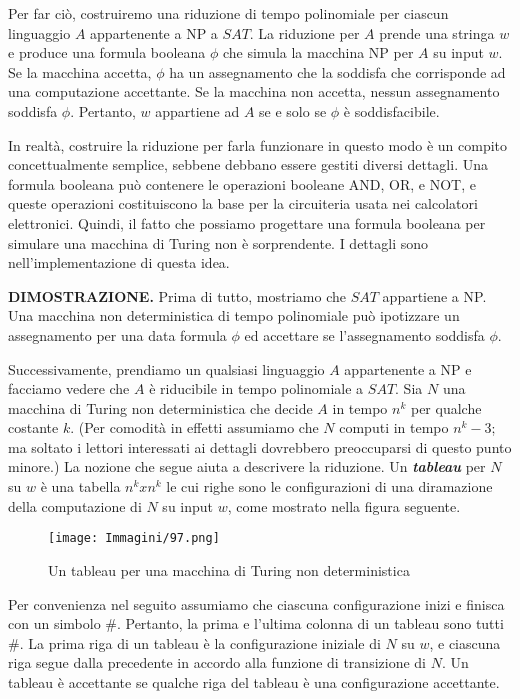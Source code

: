 \documentclass{article}
\begin{document}
Per far ciò, costruiremo una riduzione di tempo polinomiale per ciascun linguaggio $A$ appartenente a NP a $SAT$. 
La riduzione per $A$ prende una stringa $w$ e produce una formula booleana $\phi$ che simula la macchina NP per $A$ su input $w$.
Se la macchina accetta, $\phi$ ha un assegnamento che la soddisfa che corrisponde ad una computazione accettante. 
Se la macchina non accetta, nessun assegnamento soddisfa $\phi$.
Pertanto, $w$ appartiene ad $A$ se e solo se $\phi$ è soddisfacibile.

In realtà, costruire la riduzione per farla funzionare in questo modo è un compito concettualmente semplice, sebbene debbano essere gestiti diversi dettagli. 
Una formula booleana può contenere le operazioni booleane AND, OR, e NOT, e queste operazioni costituiscono la base per la circuiteria usata nei calcolatori elettronici. 
Quindi, il fatto che possiamo progettare una formula booleana per simulare una macchina di Turing non è sorprendente.
\newline
I dettagli sono nell'implementazione di questa idea.

\text{}
\newline
\textbf{DIMOSTRAZIONE.}
Prima di tutto, mostriamo che $SAT$ appartiene a NP. 
Una macchina non deterministica di tempo polinomiale può ipotizzare un assegnamento per una data formula $\phi$ ed accettare se l'assegnamento soddisfa $\phi$.

Successivamente, prendiamo un qualsiasi linguaggio $A$ appartenente a NP e facciamo vedere che $A$ è riducibile in tempo polinomiale a $SAT$.
Sia $N$ una macchina di Turing non deterministica che decide $A$ in tempo $n^k$ per qualche costante $k$. 
(Per comodità in effetti assumiamo che $N$ computi in tempo $n^k - 3$; ma soltato i lettori interessati ai dettagli dovrebbero preoccuparsi di questo punto minore.)
La nozione che segue aiuta a descrivere la riduzione.
Un \textbf{\textit{tableau}} per $N$ su $w$ è una tabella $n^k x n^k$ le cui righe sono le configurazioni di una diramazione della computazione di $N$ su input $w$, come mostrato nella figura seguente.
\begin{figure}[H]
    \centering
    \texttt{[image: Immagini/97.png]}
    \caption{Un tableau per una macchina di Turing non deterministica}
    \label{fig:tableau}
\end{figure}
Per convenienza nel seguito assumiamo che ciascuna configurazione inizi e finisca con un simbolo \#.
Pertanto, la prima e l'ultima colonna di un tableau sono tutti \#.
La prima riga di un tableau è la configurazione iniziale di $N$
su $w$, e ciascuna riga segue dalla precedente in accordo alla funzione di transizione di $N$.
Un tableau è accettante se qualche riga del tableau è una configurazione accettante.
\end{document}
